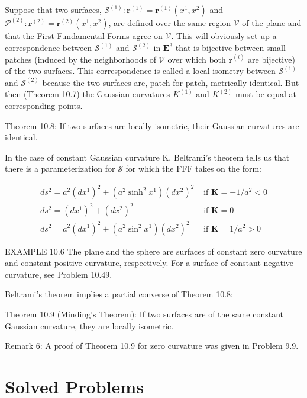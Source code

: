 \documentclass[10pt]{article}
\begin{document}
Suppose that two surfaces, $\mathscr{S}^{(1)}: \mathbf{r}^{(1)}=\mathbf{r}^{(1)}\left(x^{1}, x^{2}\right)$ and $\mathscr{P}^{(2)}: \mathbf{r}^{(2)}=\mathbf{r}^{(2)}\left(x^{1}, x^{2}\right)$, are defined over the same region $\mathscr{V}$ of the plane and that the First Fundamental Forms agree on $\mathscr{V}$. This will obviously set up a correspondence between $\mathscr{S}^{(1)}$ and $\mathscr{S}^{(2)}$ in $\mathbf{E}^{3}$ that is bijective between small patches (induced by the neighborhoods of $\mathscr{V}$ over which both $\mathbf{r}^{(i)}$ are bijective) of the two surfaces. This correspondence is called a local isometry between $\mathscr{S}^{(1)}$ and $\mathscr{S}^{(2)}$ because the two surfaces are, patch for patch, metrically identical. But then (Theorem 10.7) the Gaussian curvatures $K^{(1)}$ and $K^{(2)}$ must be equal at corresponding points.

Theorem 10.8: If two surfaces are locally isometric, their Gaussian curvatures are identical.

In the case of constant Gaussian curvature K, Beltrami's theorem tells us that there is a parameterization for $\mathscr{S}$ for which the FFF takes on the form:

$$
\begin{array}{ll}
d s^{2}=a^{2}\left(d x^{1}\right)^{2}+\left(a^{2} \sinh ^{2} x^{1}\right)\left(d x^{2}\right)^{2} & \text { if } \mathbf{K}=-1 / a^{2}<0 \\
d s^{2}=\left(d x^{1}\right)^{2}+\left(d x^{2}\right)^{2} & \text { if } \mathbf{K}=0 \\
d s^{2}=a^{2}\left(d x^{1}\right)^{2}+\left(a^{2} \sin ^{2} x^{1}\right)\left(d x^{2}\right)^{2} & \text { if } \mathbf{K}=1 / a^{2}>0
\end{array}
$$

EXAMPLE 10.6 The plane and the sphere are surfaces of constant zero curvature and constant positive curvature, respectively. For a surface of constant negative curvature, see Problem 10.49.

Beltrami's theorem implies a partial converse of Theorem 10.8:

Theorem 10.9 (Minding's Theorem): If two surfaces are of the same constant Gaussian curvature, they are locally isometric.

Remark 6: A proof of Theorem 10.9 for zero curvature was given in Problem 9.9.

\section*{Solved Problems}
\end{document}
